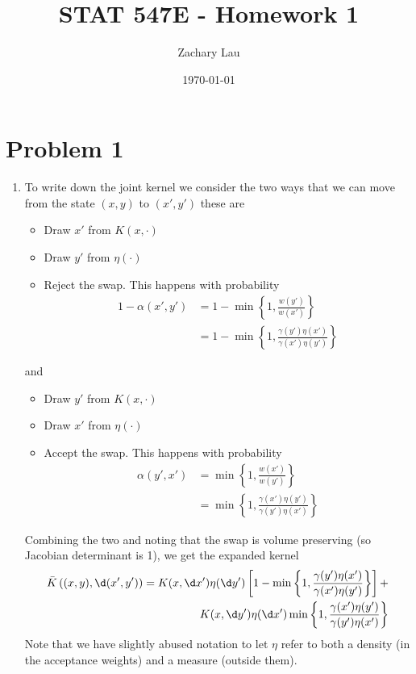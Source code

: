 \documentclass{article}
\title{STAT 547E - Homework 1}
\author{Zachary Lau}
\date{\today}
\begin{document}
\maketitle
\section{Problem 1}
    \begin{enumerate}
        \item %
        To write down the joint kernel we consider the two ways that we can move
        from the state $(x,y)$ to $(x',y')$ these are 
        \begin{itemize}
            \item Draw $x'$ from $K(x,\cdot)$
            \item Draw $y'$ from $\eta(\cdot)$
            \item Reject the swap. This happens with probability
            \begin{align}
                1 - \alpha(x',y') &= 1 - \min\left\{1, \frac{w(y')}{w(x')}\right\} \\ 
                &= 1 - \min\left\{1, \frac{\gamma(y')\eta(x')}{\gamma(x')\eta(y')}\right\}
            \end{align}
        \end{itemize}
        and
        \begin{itemize}
            \item Draw $y'$ from $K(x,\cdot)$
            \item Draw $x'$ from $\eta(\cdot)$
            \item Accept the swap. This happens with probability
            \begin{align}
                \alpha(y', x') &= \min\left\{1, \frac{w(x')}{w(y')} \right\} \\
                &= \min\left\{1, \frac{\gamma(x')\eta(y')}{\gamma(y')\eta(x')} \right\} 
            \end{align}
        \end{itemize}
        Combining the two and noting that the swap is volume preserving
        (so Jacobian determinant is 1), we get the expanded kernel
        \begin{align}
            \bar K \left((x,y),\d(x',y')\right) =
            K(x,\d x')\eta(\d y')
            \left[1 - \min\left\{1, \frac{\gamma(y')\eta(x')}{\gamma(x')\eta(y')}\right\}\right]
            + \\
            K(x,\d y')\eta(\d x')
            \min\left\{1, \frac{\gamma(x')\eta(y')}{\gamma(y')\eta(x')} \right\} 
        \end{align}
        Note that we have slightly abused notation to let $\eta$ refer to both
        a density (in the acceptance weights) and a measure (outside them).
        


\end{enumerate}
\end{document}
